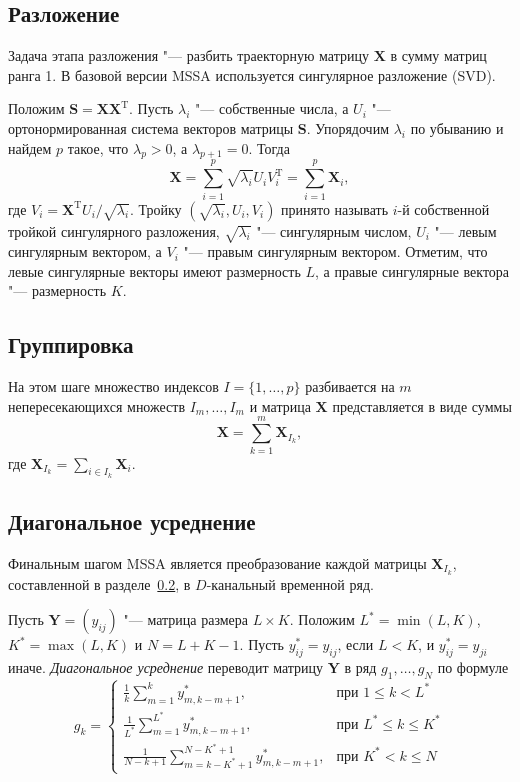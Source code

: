 \documentclass[specialist,
substylefile = spbu_report.rtx,
subf,href,colorlinks=true, 12pt]{disser}
\newcommand{\traj}{\mathbf{X}}
\newcommand{\transponse}{^\mathrm{T}}
\theoremstyle{definition}
\begin{document}
	\subsection{Разложение}
	Задача этапа разложения "--- разбить траекторную матрицу $\traj$ в сумму матриц ранга 1. В базовой версии MSSA используется сингулярное разложение (SVD).
	
	Положим $\mathbf{S}=\traj\traj\transponse$. Пусть $\lambda_i$ "--- собственные числа, а $U_i$ "--- ортонормированная система векторов матрицы $\mathbf{S}$. Упорядочим $\lambda_i$ по убыванию и найдем $p$ такое, что $\lambda_p>0$, а $\lambda_{p+1}=0$. Тогда
	\[
	\traj=\sum_{i=1}^p\sqrt{\lambda_i}U_iV_i\transponse=\sum_{i=1}^p\traj_i,
	\] 
	где $V_i=\traj\transponse U_i/\sqrt{\lambda_i}$. Тройку $(\sqrt{\lambda_i}, U_i, V_i)$ принято называть $i$-й собственной тройкой сингулярного разложения, $\sqrt{\lambda_i}$ "--- сингулярным числом, $U_i$ "--- левым сингулярным вектором, а $V_i$ "--- правым сингулярным вектором. Отметим, что левые сингулярные векторы имеют размерность $L$, а правые сингулярные вектора "--- размерность $K$. 
	\subsection{Группировка}\label{sect:grouping}
	На этом шаге множество индексов $I=\{1,\ldots,p\}$ разбивается на $m$ непересекающихся множеств $I_m,\ldots,I_m$ и матрица $\traj$ представляется в виде суммы
	\[
	\traj = \sum_{k=1}^m \traj_{I_k},
	\]
	где $\traj_{I_k}=\sum_{i\in I_k}\traj_i$.
	\subsection{Диагональное усреднение}\label{sect:averaging}
	Финальным шагом MSSA является преобразование каждой матрицы $\traj_{I_k}$, составленной в разделе~\ref{sect:grouping}, в $D$-канальный временной ряд.
	
	Пусть $\mathbf Y=(y_{ij})$ "--- матрица размера $L\times K$. Положим $L^*=\min(L,K)$, $K^*=\max(L,K)$ и $N=L+K-1$. Пусть $y^*_{ij}=y_{ij}$, если $L<K$, и $y^*_{ij}=y_{ji}$ иначе. \textit{Диагональное усреднение} переводит матрицу $\mathbf{Y}$ в ряд $g_1,\ldots,g_N$ по формуле
	\[
	g_k=
	\begin{cases}
		{\displaystyle\frac{1}{k}\sum_{m=1}^{k} y^*_{m,k-m+1}},&\text{при }1\leqslant k<L^*\\
		{\displaystyle\frac{1}{L^*}\sum_{m=1}^{L^*} y^*_{m,k-m+1}},&\text{при }L^*\leqslant k\leqslant K^* \\
		{\displaystyle\frac{1}{N-k+1}\sum_{m=k-K^*+1}^{N-K^*+1}y^*_{m,k-m+1}},&\text{при }K^*< k\leqslant N
	\end{cases}
	\]
	
\end{document}
